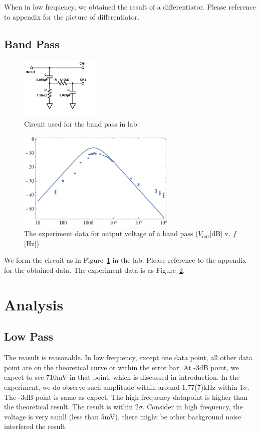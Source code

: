 \documentclass[aps,prl,reprint]{revtex4-1}
\begin{document}
        When in low frequency, we obtained the result of a differentiator. Please reference to appendix for the picture of differentiator.

    \subsection{Band Pass}
        \begin{figure}[h]
            \centering
            \includegraphics[width=1.5in]{image/bandpasslab.pdf}
            \caption{Circuit used for the band pass in lab}
            \label{fig:bandpasslab}
        \end{figure}
        \begin{figure}[h]
            \centering
            \includegraphics[width=3in]{image/bandpassplot.pdf}
            \caption{The experiment data for output voltage of a band pass ($V_\text{out}$[dB] v. $f$[Hz])}
            \label{fig:bandpassvplot}
        \end{figure}
        We form the circuit as in Figure~\ref{fig:bandpasslab} in the lab. Please reference to the appendix for the obtained data. The experiment data is as Figure~\ref{fig:bandpassvplot}.

\section{Analysis}
    \subsection{Low Pass}
        The reasult is reasonable. In low frequency, except one data point, all other data point are on the theoretical curve or within the error bar. At -3dB point, we expect to see 710mV in that point, which is discussed in introduction. In the experiment, we do observe such amplitude within around 1.77(7)kHz within $1\sigma$. The -3dB point is same as expect. The high frequency datapoint is higher than the theoretical result. The result is within $2\sigma$. Consider in high frequency, the voltage is very samll (less than 5mV), there might be other background noise interfered the result.
\end{document}
